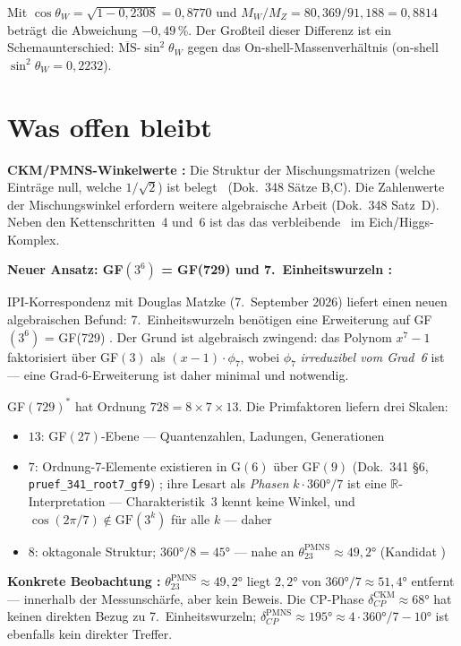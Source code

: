 \noindent Mit $\cos\theta_W = \sqrt{1-0{,}2308} = 0{,}8770$ und
$M_W/M_Z = 80{,}369/91{,}188 = 0{,}8814$ beträgt die Abweichung $-0{,}49\,\%$. Der
Großteil dieser Differenz ist ein Schemaunterschied: $\overline{\text{MS}}$-$\sin^2\theta_W$
gegen das On-shell-Massenverhältnis (on-shell $\sin^2\theta_W = 0{,}2232$).

\section{Was offen bleibt}

\textbf{CKM/PMNS-Winkelwerte \SM:}
Die Struktur der Mischungsmatrizen (welche Einträge null, welche $1/\sqrt{2}$)
ist belegt \BM\ (Dok.~348 Sätze B,C). Die Zahlenwerte der Mischungswinkel
erfordern weitere algebraische Arbeit (Dok.~348 Satz~D). Neben den
Kettenschritten~4 und~6 ist das das verbleibende \SM\ im Eich/Higgs-Komplex.

\textbf{Neuer Ansatz: GF$(3^6)$ = GF(729) und 7.\ Einheitswurzeln \SM:}

IPI-Korrespondenz mit Douglas Matzke (7.~September 2026) liefert einen
neuen algebraischen Befund: 7.\ Einheitswurzeln benötigen eine Erweiterung
auf GF$(3^6)$ = GF(729) \BM. Der Grund ist algebraisch zwingend: das Polynom
$x^7 - 1$ faktorisiert über GF$(3)$ als $(x-1)\cdot\phi_7$, wobei $\phi_7$
\emph{irreduzibel vom Grad~6} ist --- eine Grad-6-Erweiterung ist daher
minimal und notwendig.

GF$(729)^*$ hat Ordnung $728 = 8 \times 7 \times 13$. Die Primfaktoren
liefern drei Skalen:
\begin{itemize}
  \item $13$: GF$(27)$-Ebene --- Quantenzahlen, Ladungen, Generationen \BM
  \item $7$: Ordnung-7-Elemente existieren in G$(6)$ über GF$(9)$ (Dok.~341 §6,
    \texttt{pruef\_341\_root7\_gf9}) \BM; ihre Lesart als \emph{Phasen}
    $k\cdot360°/7$ ist eine $\mathbb{R}$-Interpretation --- Charakteristik~3 kennt
    keine Winkel, und $\cos(2\pi/7)\notin\mathrm{GF}(3^k)$ für alle $k$ --- daher \SM
  \item $8$: oktagonale Struktur; $360°/8 = 45°$ --- nahe an
    $\theta_{23}^\text{PMNS}\approx49{,}2°$ (Kandidat \SM)
\end{itemize}

\textbf{Konkrete Beobachtung \SM:}
$\theta_{23}^\text{PMNS}\approx49{,}2°$ liegt $2{,}2°$ von $360°/7\approx51{,}4°$
entfernt --- innerhalb der Messunschärfe, aber kein Beweis.
Die CP-Phase $\delta_{CP}^\text{CKM}\approx68°$ hat keinen direkten Bezug zu
7.\ Einheitswurzeln; $\delta_{CP}^\text{PMNS}\approx195°\approx4\cdot360°/7-10°$
ist ebenfalls kein direkter Treffer.

